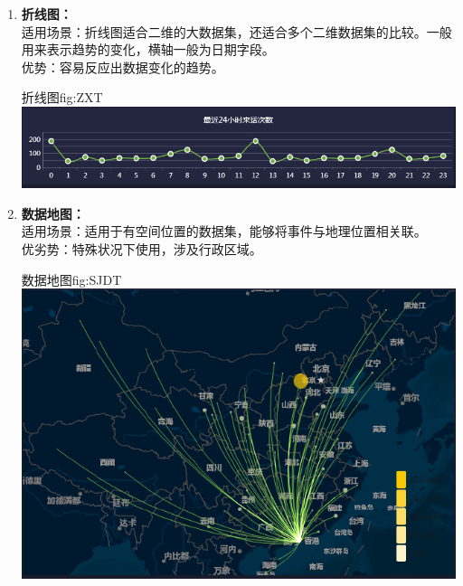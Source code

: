 \documentclass{HustGraduPaper}
\begin{document}
\begin{enumerate}
\begin{generalfig}[htb]{条形图}{fig:TXT}
        \end{generalfig}
        \item {\bfseries 折线图：\\}
        适用场景：折线图适合二维的大数据集，还适合多个二维数据集的比较。一般用来表示趋势的变化，横轴一般为日期字段。\\
        优势：容易反应出数据变化的趋势。\\ 
        \begin{generalfig}[htb]{折线图}{fig:ZXT} 
            \includegraphics[width = \textwidth]{Figures/ZXT.png}
        \end{generalfig}
        \item {\bfseries 数据地图：\\}
        适用场景：适用于有空间位置的数据集，能够将事件与地理位置相关联。\\ 
        优劣势：特殊状况下使用，涉及行政区域。\\
        \begin{generalfig}[htb]{数据地图}{fig:SJDT} 
            \includegraphics[width = \textwidth]{Figures/SJDT.png}
        \end{generalfig}
    \end{enumerate}

    

    
    
\end{document}
